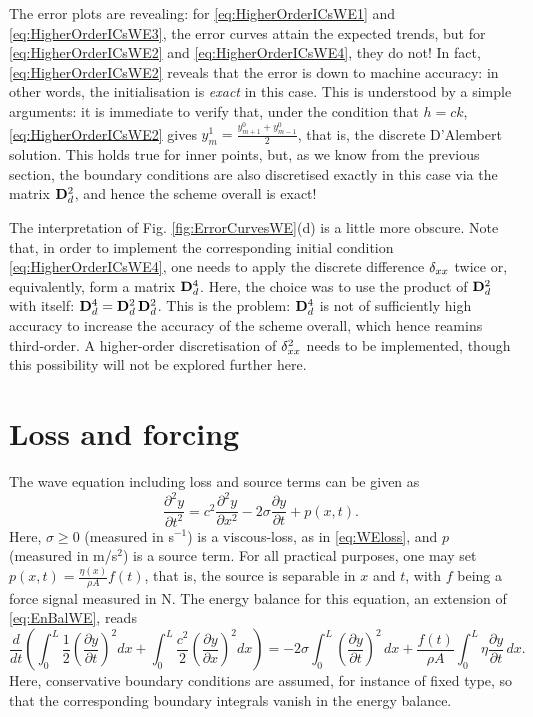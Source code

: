 The error plots are revealing: for \eqref{eq:HigherOrderICsWE1} and \eqref{eq:HigherOrderICsWE3}, the error curves attain the expected trends, but for \eqref{eq:HigherOrderICsWE2} and \eqref{eq:HigherOrderICsWE4}, they do not! In fact, \eqref{eq:HigherOrderICsWE2} reveals that the error is down to machine accuracy: in other words, the initialisation is \emph{exact} in this case. This is understood by a simple arguments: it is immediate to verify that, under the condition that $h=ck$, \eqref{eq:HigherOrderICsWE2} gives $y^1_m = \frac{y^0_{m+1}+y^0_{m-1}}{2}$, that is, the discrete D'Alembert solution. This holds true for inner points, but, as we know from the previous section, the boundary conditions are also discretised exactly in this case via the matrix ${\bf D}^2_d$, and hence the scheme overall is exact! 

The interpretation of Fig. \ref{fig:ErrorCurvesWE}(d) is a little more obscure. Note that, in order to implement the corresponding initial condition \eqref{eq:HigherOrderICsWE4}, one needs to apply the discrete difference $\delta_{xx}$ twice or, equivalently, form a matrix ${\bf D}^4_d$. Here, the choice was to use the product of ${\bf D}^2_d$ with itself: ${\bf D}^4_d = {\bf D}^2_d \, {\bf D}^2_d$. This is the problem: ${\bf D}^4_d$ is not of sufficiently high accuracy to increase the accuracy of the scheme overall, which hence reamins third-order. A higher-order discretisation of $\delta_{xx}^2$ needs to be implemented, though this possibility will not be explored further here. 


\section{Loss and forcing}


The wave equation including loss and source terms can be given as
\begin{equation}
\frac{\partial^2 y}{\partial t^2} = c^2 \frac{\partial^2 y}{\partial x^2}-2 \sigma \frac{\partial y}{\partial t} + p(x,t).
\end{equation}
Here, $\sigma \geq 0$ (measured in s$^{-1}$) is a viscous-loss, as in \eqref{eq:WEloss}, and $p$ (measured in m/s$^2$) is a source term. For all practical purposes, one may set $p(x,t) = \frac{\eta(x)}{\rho A} f(t)$, that is, the source is separable in $x$ and $t$, with $f$ being a force signal measured in N. The energy balance for this equation, an extension of \eqref{eq:EnBalWE}, reads
\begin{equation}\label{eq:EnBalanceWEQNloss}
\frac{d}{dt}\left( \int_{0}^{L} \frac{1}{2}\left( \frac{\partial y}{\partial t} \right)^2 dx + \int_{0}^{L} \frac{c^2}{2}\left( \frac{\partial y}{\partial x} \right)^2 dx \right) = -2\sigma \int_0^L \left(\frac{\partial y}{\partial t}\right)^2 \, dx + \frac{f(t)}{\rho A}\int_0^L \eta \frac{\partial y}{\partial t}\, dx.
\end{equation}
Here, conservative boundary conditions are assumed, for instance of fixed type, so that the corresponding boundary integrals vanish in the energy balance.


